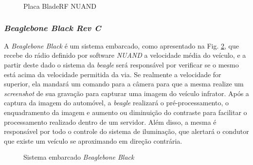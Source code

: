 \begin{figure}[!htb]
	\caption{\label{fig:bladerf} Placa BladeRF NUAND}
\end{figure}



\subsubsection{\emph{Beaglebone Black Rev C}} 

A \emph{Beaglebone Black} é um sistema embarcado, como apresentado na Fig. \ref{fig:beaglebone}, que recebe do rádio definido por software \emph{NUAND} a velocidade média do veículo, e a partir deste dado o sistema da \emph{beagle} será responsável por verificar se o mesmo está acima da velocidade permitida da via. Se realmente a velocidade for superior, ela mandará um comando para a câmera para que a mesma realize um \textit{screenshot} de sua gravação para capturar uma imagem do veículo infrator. Após a captura da imagem do automóvel, a \emph{beagle} realizará o pré-processamento, o enquadramento da imagem e aumento ou diminuição do contraste para facilitar o processamento realizado dentro de um servidor. Além disso, a mesma é responsável por todo o controle do sistema de iluminação, que alertará o condutor que existe um veículo se aproximando em direção contrária.

\begin{figure}[!htb]
	\caption{\label{fig:beaglebone} Sistema embarcado \emph{Beaglebone Black}}
\end{figure}

